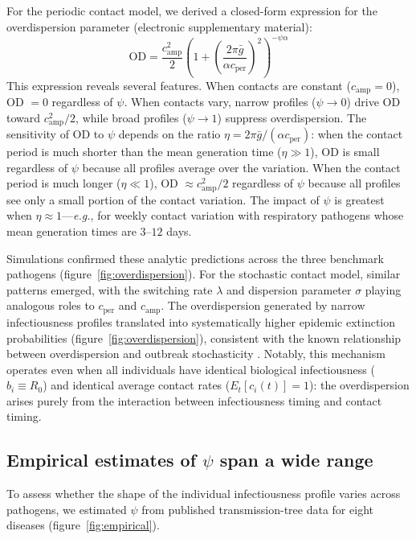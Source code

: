 \documentclass[10pt]{article}
\makeatletter
\newcommand{\eg}{\textit{e.g.}\@\xspace}
\makeatother
\begin{document}
For the periodic contact model, we derived a closed-form expression for the overdispersion parameter (electronic supplementary material):
\begin{equation}
	\text{OD} = \frac{c_\text{amp}^2}{2}\left(1 + \left(\frac{2\pi \bar{g}}{\alpha c_\text{per}}\right)^2\right)^{-\psi\alpha}
	\label{eq:OD}
\end{equation}
This expression reveals several features. When contacts are constant ($c_\text{amp} = 0$), OD $= 0$ regardless of $\psi$. When contacts vary, narrow profiles ($\psi \to 0$) drive OD toward $c_\text{amp}^2 / 2$, while broad profiles ($\psi \to 1$) suppress overdispersion. The sensitivity of OD to $\psi$ depends on the ratio $\eta = 2\pi\bar{g}/(\alpha c_\text{per})$: when the contact period is much shorter than the mean generation time ($\eta \gg 1$), OD is small regardless of $\psi$ because all profiles average over the variation. When the contact period is much longer ($\eta \ll 1$), OD $\approx c_\text{amp}^2/2$ regardless of $\psi$ because all profiles see only a small portion of the contact variation. The impact of $\psi$ is greatest when $\eta \approx 1$---\eg, for weekly contact variation with respiratory pathogens whose mean generation times are $3$--$12$ days.

Simulations confirmed these analytic predictions across the three benchmark pathogens (figure~\ref{fig:overdispersion}). For the stochastic contact model, similar patterns emerged, with the switching rate $\lambda$ and dispersion parameter $\sigma$ playing analogous roles to $c_\text{per}$ and $c_\text{amp}$. The overdispersion generated by narrow infectiousness profiles translated into systematically higher epidemic extinction probabilities (figure~\ref{fig:overdispersion}), consistent with the known relationship between overdispersion and outbreak stochasticity \citep{lloyd-smith_superspreading_2005}. Notably, this mechanism operates even when all individuals have identical biological infectiousness ($b_i \equiv R_0$) and identical average contact rates ($E_t[c_i(t)] = 1$): the overdispersion arises purely from the interaction between infectiousness timing and contact timing.

\subsection{Empirical estimates of $\psi$ span a wide range}

To assess whether the shape of the individual infectiousness profile varies across pathogens, we estimated $\psi$ from published transmission-tree data for eight diseases (figure~\ref{fig:empirical}).
\end{document}

